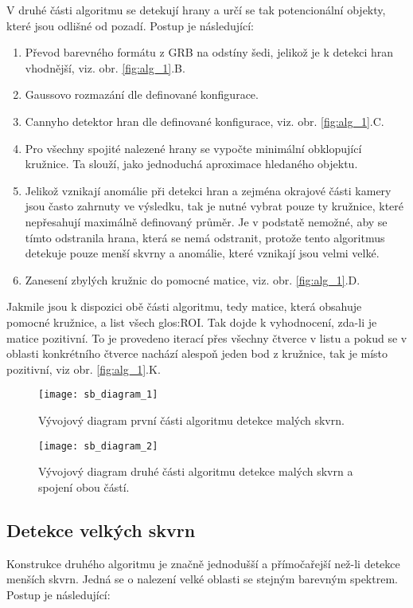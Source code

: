 V druhé části algoritmu se detekují hrany a určí se tak potencionální objekty, které jsou odlišné od pozadí. Postup je následující:
\begin{enumerate}
	\item Převod barevného formátu z GRB na odstíny šedi, jelikož je k detekci hran vhodnější, viz. obr. \ref{fig:alg_1}.B.
	\item Gaussovo rozmazání dle definované konfigurace.
	\item Cannyho detektor hran dle definované konfigurace, viz. obr. \ref{fig:alg_1}.C.
	\item Pro všechny spojité nalezené hrany se vypočte minimální obklopující kružnice. Ta slouží, jako jednoduchá aproximace hledaného objektu.
	\item Jelikož vznikají anomálie při detekci hran a zejména okrajové části kamery jsou často zahrnuty ve výsledku, tak je nutné vybrat pouze ty kružnice, které nepřesahují maximálně definovaný průměr. Je v podstatě nemožné, aby se tímto odstranila hrana, která se nemá odstranit, protože tento algoritmus detekuje pouze menší skvrny a anomálie, které vznikají jsou velmi velké.
	\item Zanesení zbylých kružnic do pomocné matice, viz. obr. \ref{fig:alg_1}.D.
\end{enumerate}

Jakmile jsou k dispozici obě části algoritmu, tedy matice, která obsahuje pomocné kružnice, a list všech \gls{glos:ROI}. Tak dojde k vyhodnocení, zda-li je matice pozitivní. To je provedeno iterací přes všechny čtverce v listu a pokud se v oblasti konkrétního čtverce nachází alespoň jeden bod z kružnice, tak je místo pozitivní, viz obr. \ref{fig:alg_1}.K.


\begin{figure}[h]
	\texttt{[image: sb\_diagram\_1]}
	\centering
	\caption{Vývojový diagram první části algoritmu detekce malých skvrn. \label{fig:sb_diagram_1}}
\end{figure} 
\FloatBarrier

\begin{figure}[h]
	\texttt{[image: sb\_diagram\_2]}
	\centering
	\caption{Vývojový diagram druhé části algoritmu detekce malých skvrn a spojení obou částí. \label{fig:sb_diagram_2}}
\end{figure} 
\FloatBarrier


\subsection{Detekce velkých skvrn}
Konstrukce druhého algoritmu je značně jednodušší a přímočařejší než-li detekce menších skvrn. Jedná se o nalezení velké oblasti se stejným barevným spektrem. Postup je následující:

